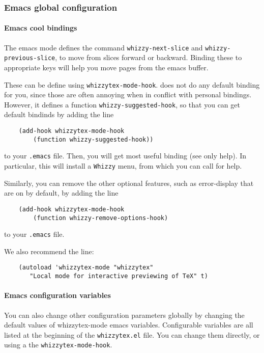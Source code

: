 \documentclass{article}
\let \lst \verb
\let \whizzy \WhizzyTeX
\begin{document}
\subsubsection {Emacs global configuration}

\paragraph {Emacs cool bindings}

The emacs mode defines the command \lst"whizzy-next-slice" and
\lst"whizzy-previous-slice", to move from slices forward or backward.
Binding these to appropriate keys will help you move pages from the emacs
buffer. 

These can be define using \lst"whizzytex-mode-hook". 
{\whizzy} does not do any default binding for you, since those are often
annoying when in conflict with personal bindings. 
However, it defines a function \lst"whizzy-suggested-hook", so that you can
get default bindinds by adding the line
\begin{verbatim}
    (add-hook whizzytex-mode-hook 
        (function whizzy-suggested-hook))
\end{verbatim}
to your \lst".emacs" file. 
Then, you will get most useful binding (see only help). 
In particular, this will install a \lst"Whizzy" menu, from which you can
call for help.

Similarly, you can remove the other optional features, 
such as error-display that are on by default, by adding the line
\begin{verbatim}
    (add-hook whizzytex-mode-hook 
        (function whizzy-remove-options-hook)
\end{verbatim}
to your \lst".emacs" file.

We also recommend the line:
\begin{verbatim}
    (autoload 'whizzytex-mode "whizzytex" 
       "Local mode for interactive previewing of TeX" t)
\end{verbatim}

\paragraph {Emacs configuration variables}

You can also change other configuration parameters globally by changing the
default values of whizzytex-mode emacs variables. 
Configurable variables are all listed at the beginning of the
\lst"whizzytex.el" file. You can change them directly, or using a 
the \lst"whizzytex-mode-hook". 
\end{document}
